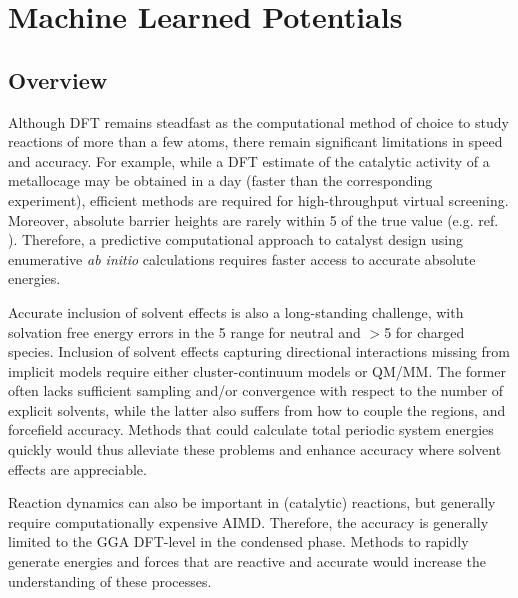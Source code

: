 \documentclass[../../main.tex]{subfiles}
\begin{document}
\setcounter{footnote}{0} 
\newcommand{\rom}[1]{\uppercase\expandafter{\romannumeral #1\relax}}


\chapter{Machine Learned Potentials}

\section{Overview}

Although DFT remains steadfast as the computational method of choice to study reactions of more than a few atoms,\cite{PribramJones2015} there remain significant limitations in speed and accuracy.\cite{Mardirossian2017} For example, while a DFT estimate of the catalytic activity of a metallocage may be obtained in a day\cite{Young2019} (faster than the corresponding experiment), efficient methods are required for high-throughput virtual screening. Moreover, absolute barrier heights are rarely within 5 \kcalx of the true value (e.g. ref. \cite{Krongchon2017}). Therefore, a predictive computational approach to catalyst design using enumerative \emph{ab initio} calculations requires faster access to accurate absolute energies. 

Accurate inclusion of solvent effects is also a long-standing challenge, with solvation free energy errors in the 5 \kcalx range for neutral and $>$5 \kcalx for charged species.\cite{Takano2004, Zhang2017} Inclusion of solvent effects capturing directional interactions missing from implicit models require either cluster-continuum models or QM/MM. The former often lacks sufficient sampling and/or convergence with respect to the number of explicit solvents,\cite{Basdogan2018} while the latter also suffers from how to couple the regions, and forcefield accuracy.\cite{Thiel2009} Methods that could calculate total periodic system energies quickly would thus alleviate these problems and enhance accuracy where solvent effects are appreciable.

Reaction dynamics can also be important in (catalytic) reactions,\cite{Grajciar2018, Stirling2014} but generally require computationally expensive AIMD. Therefore, the accuracy is generally limited to the GGA DFT-level in the condensed phase.\cite{Hassanali2014} Methods to rapidly generate energies and forces that are reactive and accurate would increase the understanding of these processes.
\end{document}
